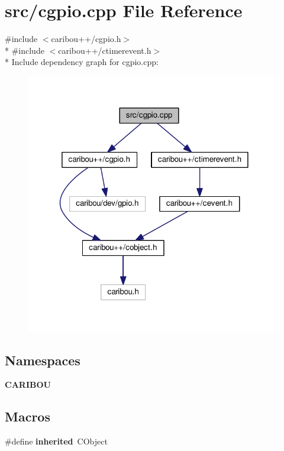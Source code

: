 \section{src/cgpio.cpp File Reference}
\label{cgpio_8cpp}
{\ttfamily \#include $<$caribou++/cgpio.\-h$>$}\\*
{\ttfamily \#include $<$caribou++/ctimerevent.\-h$>$}\\*
Include dependency graph for cgpio.\-cpp\-:\nopagebreak
\begin{figure}[H]
\begin{center}
\leavevmode
\includegraphics[width=318pt]{cgpio_8cpp__incl}
\end{center}
\end{figure}
\subsection*{Namespaces}
\begin{DoxyCompactItemize}
\item 
{\bf C\-A\-R\-I\-B\-O\-U}
\end{DoxyCompactItemize}
\subsection*{Macros}
\begin{DoxyCompactItemize}
\item 
\#define {\bf inherited}~C\-Object
\end{DoxyCompactItemize}


